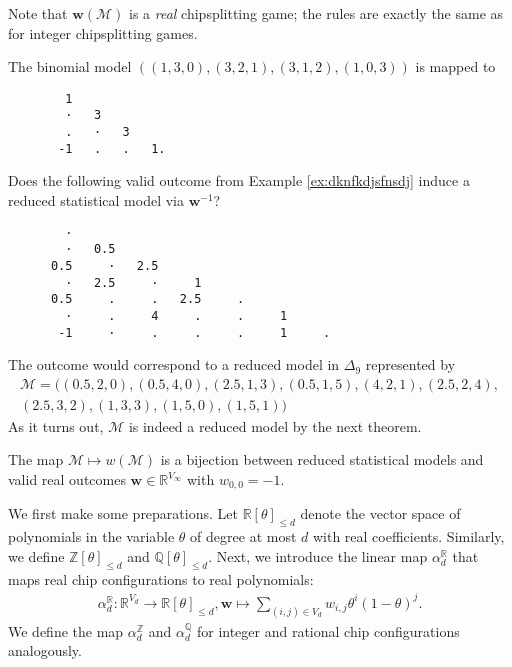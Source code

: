 Note that \( \mathbf w(\mathcal{M}) \) is a \emph{real} chipsplitting game; the rules are exactly the same as for integer chipsplitting games.

\begin{example}\label{ex:binomial-model-chip-three}
    The binomial model \( ((1,3,0), (3,2,1), (3,1,2), (1,0,3)) \) is mapped to
    \begin{verbatim}
        1
        ·   3  
        .   ·   3
       -1   .   .   1.
    \end{verbatim}
\end{example}

\begin{example}\label{ex:alpaca-andy}
    Does the following valid outcome from Example \ref{ex:dknfkdjsfnsdj} induce a reduced statistical model via \( \mathbf w^{-1} \)?
    \begin{verbatim}
        · 
        ·   0.5 
      0.5     ·   2.5 
        ·   2.5     ·     1 
      0.5     .     .   2.5     . 
        ·     .     4     .     .     1 
       -1     ·     .     .     .     1     . 
    \end{verbatim} 
    The outcome would correspond to a reduced model in \( \Delta_9 \) represented by
    \begin{gather*}
        \mathcal{M} = ((0.5, 2, 0), (0.5, 4, 0), (2.5, 1,3), (0.5, 1, 5), (4, 2,1), (2.5, 2, 4),\\ (2.5, 3,2), (1, 3,3), (1, 5,0), (1,5,1))
    \end{gather*}
    As it turns out, \( \mathcal{M} \) is indeed a reduced model by the next theorem.
\end{example}

\begin{theorem}\label{thm:outcome-reduced-model}
    The map \( \mathcal{M} \mapsto w(\mathcal{M}) \) is a bijection between reduced statistical models and valid real outcomes \( \mathbf w \in \mathbb{R}^{V_\infty} \) with \( w_{0,0} = -1 \).
\end{theorem}


We first make some preparations. Let \( \mathbb{R}[\theta]_{\leq d} \) denote the vector space of polynomials in the variable \( \theta \) of degree at most \( d \) with real coefficients. Similarly, we define \( \mathbb{Z}[\theta]_{\leq d} \) and \( \mathbb{Q}[\theta]_{\leq d} \). Next, we introduce the linear map \( \alpha_{d}^{\mathbb R} \) that maps real chip configurations to real polynomials:
\begin{align*}
    \alpha_d^{\mathbb R}: \mathbb{R}^{V_d} \to \mathbb{R}[\theta]_{\leq d}, 
    \mathbf{w} \mapsto \sum_{(i,j) \in V_d} w_{i,j} \theta^{i}(1-\theta)^j.
\end{align*}
We define the map \( \alpha_d^{\mathbb Z} \) and \( \alpha_d^{\mathbb Q} \) for integer and rational chip configurations analogously.


